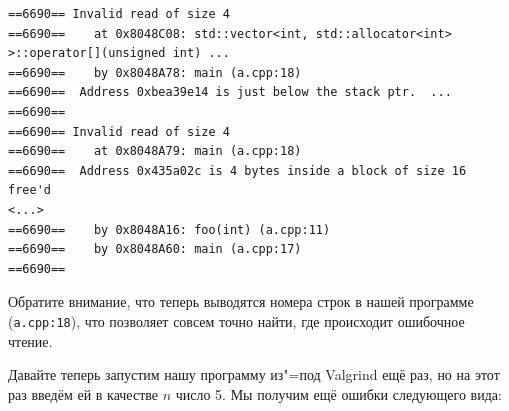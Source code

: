\documentclass[a4paper,10pt]{problems}
\begin{document}
{\footnotesize
\begin{verbatim}
==6690== Invalid read of size 4                                                                                                                                                                                                                                                
==6690==    at 0x8048C08: std::vector<int, std::allocator<int> >::operator[](unsigned int) ...
==6690==    by 0x8048A78: main (a.cpp:18)                                                                                                                                                                                                                                      
==6690==  Address 0xbea39e14 is just below the stack ptr.  ...
==6690==                                                                                                                                                                                                                                                                       
==6690== Invalid read of size 4                                                                                                                                                                                                                                                
==6690==    at 0x8048A79: main (a.cpp:18)                                                                                                                                                                                                                                      
==6690==  Address 0x435a02c is 4 bytes inside a block of size 16 free'd                                                                                                                                                                                                        
<...>
==6690==    by 0x8048A16: foo(int) (a.cpp:11)
==6690==    by 0x8048A60: main (a.cpp:17)
==6690== 
\end{verbatim}
\par}

Обратите внимание, что теперь выводятся номера строк в нашей программе (\verb`a.cpp:18`), что позволяет совсем точно найти, где происходит ошибочное чтение.

Давайте теперь запустим нашу программу из"=под Valgrind ещё раз, но на этот раз введём ей в качестве $n$ число 5. Мы получим ещё ошибки следующего вида:
\end{document}
